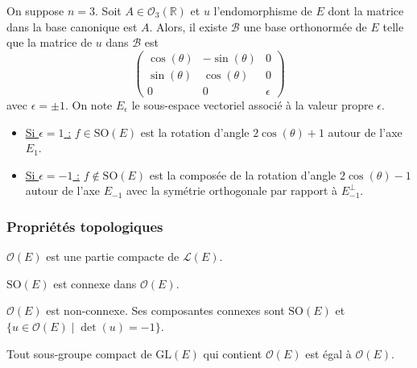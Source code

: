   \begin{theorem}
    On suppose $n = 3$. Soit $A \in \mathcal{O}_3(\mathbb{R})$ et $u$ l'endomorphisme de $E$ dont la matrice dans la base canonique est $A$. Alors, il existe $\mathcal{B}$ une base orthonormée de $E$ telle que la matrice de $u$ dans $\mathcal{B}$ est
    \[ \begin{pmatrix} \cos(\theta) & -\sin(\theta) & 0 \\ \sin(\theta) & \cos(\theta) & 0 \\ 0 & 0 & \epsilon \end{pmatrix} \]
    avec $\epsilon = \pm 1$. On note $E_\epsilon$ le sous-espace vectoriel associé à la valeur propre $\epsilon$.
    \begin{itemize}
      \item \uline{Si $\epsilon = 1$ :} $f \in \mathrm{SO}(E)$ est la rotation d'angle $2\cos(\theta) + 1$ autour de l'axe $E_1$.
      \item \uline{Si $\epsilon = -1$ :} $f \notin \mathrm{SO}(E)$ est la composée de la rotation d'angle $2\cos(\theta) - 1$ autour de l'axe $E_{-1}$ avec la symétrie orthogonale par rapport à $E_{-1}^{\perp}$.
    \end{itemize}
  \end{theorem}

  \subsubsection{Propriétés topologiques}


  \begin{proposition}
    $\mathcal{O}(E)$ est une partie compacte de $\mathcal{L}(E)$.
  \end{proposition}

  \begin{proposition}
    $\mathrm{SO}(E)$ est connexe dans $\mathcal{O}(E)$.
  \end{proposition}

  \begin{corollary}
    $\mathcal{O}(E)$ est non-connexe. Ses composantes connexes sont $\mathrm{SO}(E)$ et $\{ u \in \mathcal{O}(E) \mid \det(u) = -1 \}$.
  \end{corollary}


  \begin{proposition}
    Tout sous-groupe compact de $\mathrm{GL}(E)$ qui contient $\mathcal{O}(E)$ est égal à $\mathcal{O}(E)$.
  \end{proposition}

